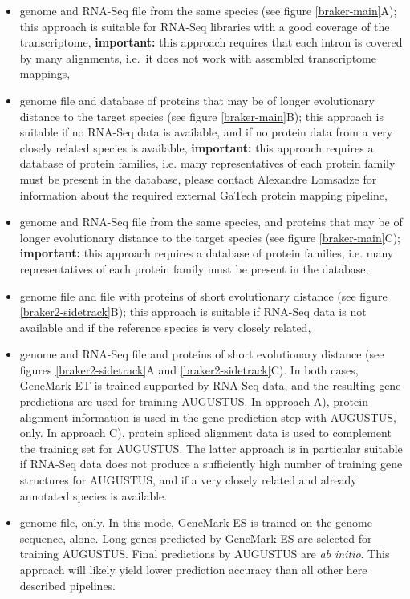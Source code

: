 \documentclass[a4paper,10pt]{report}
\begin{document}
\begin{itemize}
 \item genome and RNA-Seq file from the same species (see figure \ref{braker-main}A); this approach is suitable for RNA-Seq libraries with a good coverage of the transcriptome, \textbf{important:} this approach requires that each intron is covered by many alignments, i.e.~it does not work with assembled transcriptome mappings,
 \item genome file and database of proteins that may be of longer evolutionary distance to the target species (see figure \ref{braker-main}B); this approach is suitable if no RNA-Seq data is available, and if no protein data from a very closely related species is available, \textbf{important:} this approach requires a database of protein families, i.e. many representatives of each protein family must be present in the database, please contact Alexandre Lomsadze for information about the required external GaTech protein mapping pipeline,
 \item genome and RNA-Seq file from the same species, and proteins that may be of longer evolutionary distance to the target species (see figure \ref{braker-main}C); \textbf{important:} this approach requires a database of protein families, i.e. many representatives of each protein family must be present in the database,
 \item genome file and file with proteins of short evolutionary distance (see figure \ref{braker2-sidetrack}B); this approach is suitable if RNA-Seq data is not available and if the reference species is very closely related,
 \item genome and RNA-Seq file and proteins of short evolutionary distance (see figures \ref{braker2-sidetrack}A and \ref{braker2-sidetrack}C). In both cases, GeneMark-ET is trained supported by RNA-Seq data, and the resulting gene predictions are used for training AUGUSTUS. In approach A), protein alignment information is used in the gene prediction step with AUGUSTUS, only. In approach C), protein spliced alignment data is used to complement the training set for AUGUSTUS. The latter approach is in particular suitable if RNA-Seq data does not produce a sufficiently high number of training gene structures for AUGUSTUS, and if a very closely related and already annotated species is available.
 \item genome file, only. In this mode, GeneMark-ES is trained on the genome sequence, alone. Long genes predicted by GeneMark-ES are selected for training AUGUSTUS. Final predictions by AUGUSTUS are \textit{ab initio}. This approach will likely yield lower prediction accuracy than all other here described pipelines.
\end{itemize}
\end{document}
